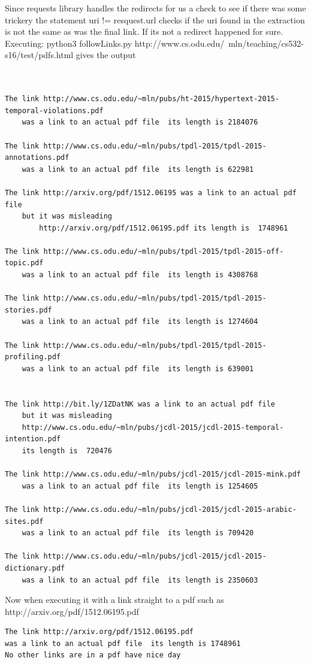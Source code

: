 \documentclass[letterpaper,10pt]{article}
\begin{document}
Since requests library handles the redirects for us a check to see if there was some trickery the statement uri != resquest.url checks if the uri found in the extraction is not the same as was the final link. If its not a redirect happened for sure.
\newline
Executing: python3 followLinks.py http://www.cs.odu.edu/~mln/teaching/cs532-s16/test/pdfs.html gives the output
\begin{verbatim}


The link http://www.cs.odu.edu/~mln/pubs/ht-2015/hypertext-2015-temporal-violations.pdf 
	was a link to an actual pdf file  its length is 2184076

The link http://www.cs.odu.edu/~mln/pubs/tpdl-2015/tpdl-2015-annotations.pdf 
	was a link to an actual pdf file  its length is 622981

The link http://arxiv.org/pdf/1512.06195 was a link to an actual pdf file  
	but it was misleading 
		http://arxiv.org/pdf/1512.06195.pdf its length is  1748961

The link http://www.cs.odu.edu/~mln/pubs/tpdl-2015/tpdl-2015-off-topic.pdf 
	was a link to an actual pdf file  its length is 4308768

The link http://www.cs.odu.edu/~mln/pubs/tpdl-2015/tpdl-2015-stories.pdf 
	was a link to an actual pdf file  its length is 1274604

The link http://www.cs.odu.edu/~mln/pubs/tpdl-2015/tpdl-2015-profiling.pdf 
	was a link to an actual pdf file  its length is 639001


The link http://bit.ly/1ZDatNK was a link to an actual pdf file  
	but it was misleading 
	http://www.cs.odu.edu/~mln/pubs/jcdl-2015/jcdl-2015-temporal-intention.pdf 
	its length is  720476

The link http://www.cs.odu.edu/~mln/pubs/jcdl-2015/jcdl-2015-mink.pdf 
	was a link to an actual pdf file  its length is 1254605

The link http://www.cs.odu.edu/~mln/pubs/jcdl-2015/jcdl-2015-arabic-sites.pdf 
	was a link to an actual pdf file  its length is 709420

The link http://www.cs.odu.edu/~mln/pubs/jcdl-2015/jcdl-2015-dictionary.pdf 
	was a link to an actual pdf file  its length is 2350603

\end{verbatim}
\noindent
\newline
Now when executing it with a link straight to a pdf such as http://arxiv.org/pdf/1512.06195.pdf
\begin{verbatim}
The link http://arxiv.org/pdf/1512.06195.pdf 
was a link to an actual pdf file  its length is 1748961
No other links are in a pdf have nice day
\end{verbatim}
\end{document}

